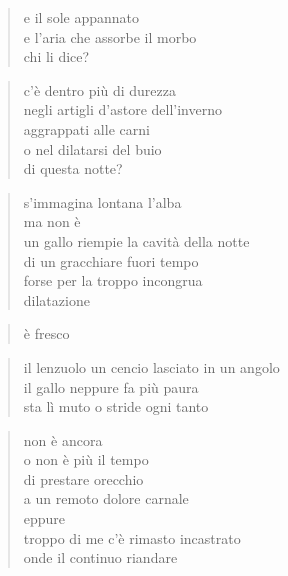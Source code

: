 \begin{verse}
    e il sole appannato\\
    e l’aria che assorbe il morbo\\
    chi li dice?
\end{verse}

\clearpage


\begin{verse}
    c’è dentro più di durezza\\
    negli artigli d'astore dell'inverno\\
    aggrappati alle carni\\
    o nel dilatarsi del buio\\
    di questa notte?
\end{verse}

\begin{verse}
    s'immagina lontana l'alba\\
    ma non è\\
    un gallo riempie la cavità della notte\\
    di un gracchiare fuori tempo\\
    forse per la troppo incongrua\\
    dilatazione
\end{verse}

\begin{verse}
    è fresco
\end{verse}

\begin{verse}
    il lenzuolo un cencio lasciato in un angolo\\
    il gallo neppure fa più paura\\
    sta lì muto o stride ogni tanto
\end{verse}

\clearpage


\begin{verse}
    non è ancora\\
    o non è più il tempo\\
    di prestare orecchio\\
    a un remoto dolore carnale\\
    eppure\\
    troppo di me c'è rimasto incastrato\\
    onde il continuo riandare
\end{verse}

\clearpage

